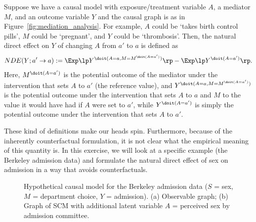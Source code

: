 Suppose we have a causal model with exposure/treatment variable $A$, a mediator $M$, and an outcome variable $Y$
and the causal graph is as in Figure~\ref{fig:mediation_analysis}.
For example, $A$ could be `takes birth control pills', $M$ could be `pregnant', and $Y$ could be `thrombosis'.
Then, the natural direct effect on $Y$ of changing $A$ from $a'$ to $a$ is defined as
\begin{equation}\label{eq:nde_counterfactual}
NDE(Y; a' \to a) := \Exp \lp Y^{\doit(A=a,M=M^{\doit(A=a')})} \rp - \Exp \lp Y^{\doit(A=a')} \rp.
\end{equation}
Here, $M^{\doit(A=a')}$ is the potential outcome of the mediator under the intervention that sets $A$ to $a'$ (the reference value),
and $Y^{\doit(A=a,M=M^{\doit(A=a')})}$ is the potential outcome under the intervention that sets $A$ to $a$ and $M$ to the value it would have had if $A$ were set to $a'$,
while $Y^{\doit(A=a')}$ is simply the potential outcome under the intervention that sets $A$ to $a'$.

These kind of definitions make our heads spin. 
Furthermore, because of the inherently counterfactual formulation, it is not clear what the empirical meaning of this quantity is.
In this exercise, we will look at a specific example (the Berkeley admission data) and formulate the natural direct effect of sex on admission in a way that avoids counterfactuals.


\begin{figure}[!h]\centering
{}
\caption{\label{fig:natural_direct_effect_Berkeley}Hypothetical causal model for the Berkeley admission data
  ($S$ = sex, $M$ = department choice, $Y$ = admission). (a) Observable graph; (b) Graph of SCM with
  additional latent variable $A$ = perceived sex by admission committee.}
\end{figure}


